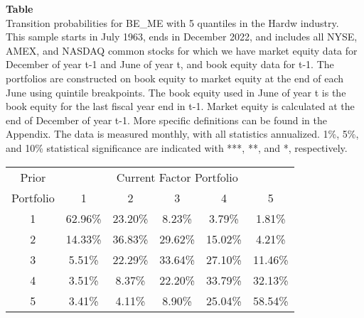\begin{table*}[ht!]
\raggedright
{}
\label{tab: transition_probs_BE_ME_Hardw_with_5_quantiles}
\textbf{Table \thetable} \\
Transition probabilities for BE_ME with 5 quantiles in the Hardw industry. \\
\hspace*{1em}This sample starts in July 1963, ends in December 2022, and includes all NYSE, AMEX, and NASDAQ common stocks for which we have market equity data for December of year t-1 and June of year t, and book equity data for t-1. The portfolios are constructed on book equity to market equity at the end of each June using quintile breakpoints.  The book equity used in June of year t is the book equity for the last fiscal year end in t-1.  Market equity is calculated at the end of December of year t-1.  More specific definitions can be found in the Appendix.  The data is measured monthly, with all statistics annualized.  1\%, 5\%, and 10\% statistical significance are indicated with ***, **, and *, respectively. \\
\vspace{0.5em}
\centering
\begin{adjustbox}{max width=\textwidth}
\begin{tabular}{@{}cccccc@{}}
\toprule
Prior & \multicolumn{5}{c}{Current Factor Portfolio} \\
Portfolio & 1 & 2 & 3 & 4 & 5 \\
\midrule
1 & 62.96\% & 23.20\% & 8.23\% & 3.79\% & 1.81\% \\
2 & 14.33\% & 36.83\% & 29.62\% & 15.02\% & 4.21\% \\
3 & 5.51\% & 22.29\% & 33.64\% & 27.10\% & 11.46\% \\
4 & 3.51\% & 8.37\% & 22.20\% & 33.79\% & 32.13\% \\
5 & 3.41\% & 4.11\% & 8.90\% & 25.04\% & 58.54\% \\
\bottomrule
\end{tabular}
\end{adjustbox}
\end{table*}
